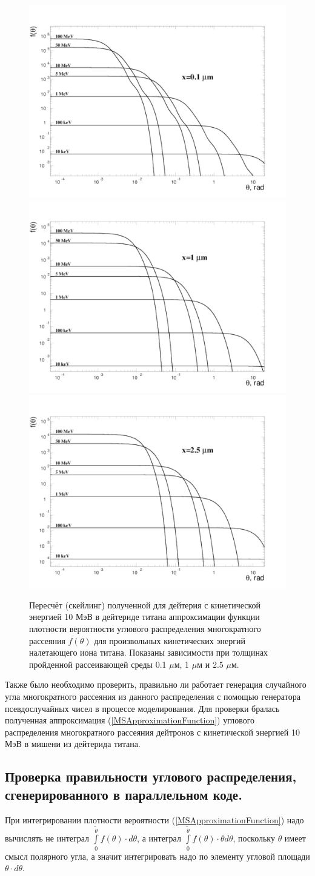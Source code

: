 \documentclass[a4paper,12pt]{article}
\begin{document}
\begin{large}
\begin{figure}[ht]
{
   \includegraphics[width=0.32\linewidth]{images/funtheta_0_1mkm_ti.pdf}
   \includegraphics[width=0.32\linewidth]{images/funtheta_1mkm_ti.pdf}
   \includegraphics[width=0.32\linewidth]{images/funtheta_2_5mkm_ti.pdf}
}
\caption{Пересчёт (скейлинг) полученной для дейтерия с кинетической энергией 10 МэВ в дейтериде титана аппроксимации функции плотности вероятности углового распределения многократного рассеяния $f(\theta)$ для произвольных кинетических энергий налетающего иона титана. Показаны зависимости при толщинах пройденной рассеивающей среды 0.1 $\mu$м, 1 $\mu$м и 2.5 $\mu$м.}
\label{fig:MFthetaScalingTitan}
\end{figure}

	Также было необходимо проверить, правильно ли работает генерация случайного угла многократного рассеяния из данного распределения с помощью генератора псевдослучайных чисел в процессе моделирования. Для проверки бралась полученная аппроксимация (\ref{MSApproximationFunction}) углового распределения многократного рассеяния дейтронов с кинетической энергией 10 МэВ в мишени из дейтерида титана.
	
\subsection{Проверка правильности углового распределения, сгенерированного в параллельном коде.}
\label{subValMS3}

	При интегрировании плотности вероятности (\ref{MSApproximationFunction}) надо вычислять не интеграл $\int\limits_{0}^{\tilde \theta} f(\theta) \cdot d\theta$, а интеграл $\int\limits_{0}^{\tilde \theta} f(\theta) \cdot \theta d\theta$, поскольку $\theta$ имеет смысл полярного угла, а значит интегрировать надо по элементу угловой площади $\theta \cdot d \theta$.
	

\end{large}
\end{document}
